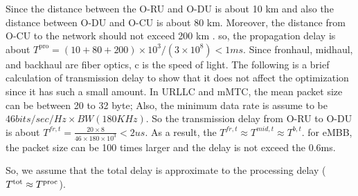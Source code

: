 \documentclass[lettersize,journal]{IEEEtran}
\begin{document}
Since the distance between the O-RU and O-DU is about 10 km and also the distance between O-DU and O-CU is about 80 km. Moreover, the distance from O-CU to the network should not exceed 200 km \cite{oranD1}. so, the propagation delay is about $T^{\text{pro}} = (10 + 80 + 200)\times 10^3 /(3\times 10^8) < 1ms $. Since fronhaul, midhaul, and backhaul are fiber optics, c is the speed of light.
The following is a brief calculation of transmission delay to show that it does not affect the optimization since it has such a small amount.
In URLLC and mMTC, the mean packet size can be between 20 to 32 byte; Also, the minimum data rate is assume to be $46 bits/sec/Hz \times BW (180 KHz)$. So the transmission delay from O-RU to O-DU is about $T^{fr,t} = \frac{20\times 8}{46 \times 180 \times 10^3} < 2 us$. As a result, the $T^{fr,t} \approx T^{mid,t} \approx T^{b,t}$. for eMBB, the packet size can be 100 times larger and the delay is not exceed the 0.6ms.


So, we assume that the total delay is approximate to the processing delay ($T^{\text{\text{tot}}} \approx T^{\text{proc}}$).
\end{document}
